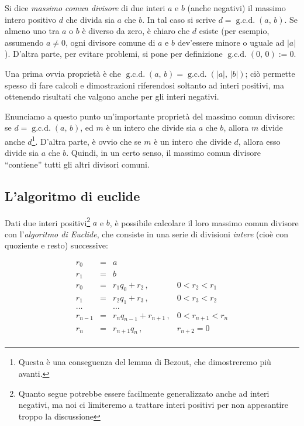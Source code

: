 \documentclass[pdflatex,11pt,a4paper,oneside]{article}
\newcommand{\abs}[1]{\left|{#1}\right|}
\newcommand{\gcdop}[0]{\ensuremath{\operatorname{g.c.d.}}}
\newcommand{\xgcd}[1]{\ensuremath{\gcdop\left({#1}\right)}}
\renewcommand{\gcd}[2]{\xgcd{{#1},\,{#2}}}
\begin{document}
Si dice \emph{massimo comun divisore} di due interi $a$ e $b$ (anche
negativi) il massimo intero positivo $d$ che divida sia $a$ che $b$.
In tal caso si scrive $d = \gcd{a}{b}$.  Se almeno uno tra $a$ o $b$
\`e diverso da zero, \`e chiaro che $d$ esiste (per esempio, assumendo
$a \neq 0$, ogni divisore comune di $a$ e $b$ dev'essere minore o
uguale ad $\abs{a}$).  D'altra parte, per evitare problemi, si pone
per definizione $\gcd{0}{0} := 0$.

Una prima ovvia propriet\`a \`e che $\gcd{a}{b} = \gcd{\abs{a}}{\abs{b}}$;
ci\`o permette spesso di fare calcoli e dimostrazioni riferendosi soltanto
ad interi positivi, ma ottenendo risultati che valgono anche per gli
interi negativi.

Enunciamo a questo punto un'importante propriet\`a del massimo comun
divisore: se $d = \gcd{a}{b}$, ed $m$ \`e un intero che divide sia $a$
che $b$, allora $m$ divide anche $d$\footnote{Questa \`e una conseguenza
del lemma di Bezout, che dimostreremo pi\`u avanti.}. D'altra parte, \`e
ovvio che se $m$ \`e un intero che divide $d$, allora esso divide sia $a$
che $b$. Quindi, in un certo senso, il massimo comun divisore ``contiene''
tutti gli altri divisori comuni.


\subsection{L'algoritmo di euclide}

Dati due interi positivi\footnote{Quanto segue potrebbe essere facilmente
generalizzato anche ad interi negativi, ma noi ci limiteremo a trattare
interi positivi per non appesantire troppo la discussione} $a$ e $b$,
\`e possibile calcolare il loro massimo comun divisore con
l'\emph{algoritmo di Euclide}, che consiste in una serie di divisioni
\emph{intere} (cio\`e con quoziente e resto) successive:

\begin{displaymath}
  \begin{array}{rcll}
      r_0  & \!=\! & a \\
      r_1  & \!=\! & b \\
      r_0  & \!=\! & r_1 q_0 + r_2\,, & 0 < r_2 < r_1 \\
      r_1  & \!=\! & r_2 q_1 + r_3\,, & 0 < r_3 < r_2 \\
    \ldots &       & \ldots \\
   r_{n-1} & \!=\! & r_{n} q_{n-1} + r_{n+1}\,, & 0 < r_{n+1} < r_{n} \\
     r_{n} & \!=\! & r_{n+1} q_{n}\,, & r_{n+2} = 0 \\
  \end{array}
\end{displaymath}
\end{document}
